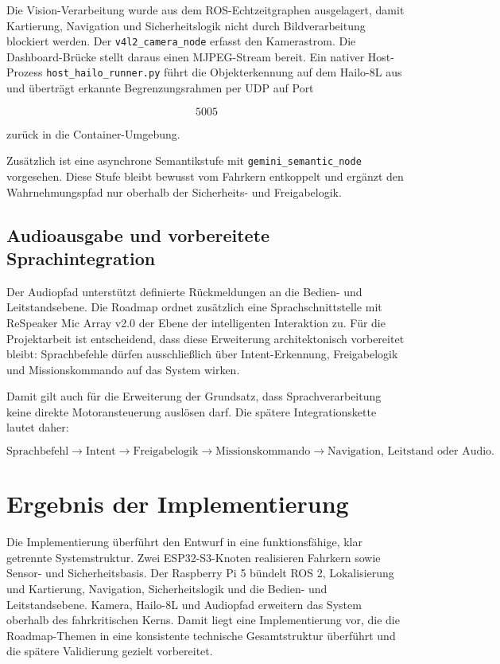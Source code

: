 Die Vision-Verarbeitung wurde aus dem ROS-Echtzeitgraphen ausgelagert, damit Kartierung, Navigation und Sicherheitslogik nicht durch Bildverarbeitung blockiert werden. Der \texttt{v4l2\_camera\_node} erfasst den Kamerastrom. Die Dashboard-Brücke stellt daraus einen MJPEG-Stream bereit. Ein nativer Host-Prozess \texttt{host\_hailo\_runner.py} führt die Objekterkennung auf dem Hailo-8L aus und überträgt erkannte Begrenzungsrahmen per UDP auf Port

$$5005$$

zurück in die Container-Umgebung.

Zusätzlich ist eine asynchrone Semantikstufe mit \texttt{gemini\_semantic\_node} vorgesehen. Diese Stufe bleibt bewusst vom Fahrkern entkoppelt und ergänzt den Wahrnehmungspfad nur oberhalb der Sicherheits- und Freigabelogik.

\subsection{Audioausgabe und vorbereitete Sprachintegration}

Der Audiopfad unterstützt definierte Rückmeldungen an die Bedien- und Leitstandsebene. Die Roadmap ordnet zusätzlich eine Sprachschnittstelle mit ReSpeaker Mic Array v2.0 der Ebene der intelligenten Interaktion zu. Für die Projektarbeit ist entscheidend, dass diese Erweiterung architektonisch vorbereitet bleibt: Sprachbefehle dürfen ausschließlich über Intent-Erkennung, Freigabelogik und Missionskommando auf das System wirken.

Damit gilt auch für die Erweiterung der Grundsatz, dass Sprachverarbeitung keine direkte Motoransteuerung auslösen darf. Die spätere Integrationskette lautet daher:

$$\text{Sprachbefehl} \rightarrow \text{Intent} \rightarrow \text{Freigabelogik} \rightarrow \text{Missionskommando} \rightarrow \text{Navigation, Leitstand oder Audio}.$$

\section{Ergebnis der Implementierung}

Die Implementierung überführt den Entwurf in eine funktionsfähige, klar getrennte Systemstruktur. Zwei ESP32-S3-Knoten realisieren Fahrkern sowie Sensor- und Sicherheitsbasis. Der Raspberry Pi 5 bündelt ROS 2, Lokalisierung und Kartierung, Navigation, Sicherheitslogik und die Bedien- und Leitstandsebene. Kamera, Hailo-8L und Audiopfad erweitern das System oberhalb des fahrkritischen Kerns. Damit liegt eine Implementierung vor, die die Roadmap-Themen in eine konsistente technische Gesamtstruktur überführt und die spätere Validierung gezielt vorbereitet.
